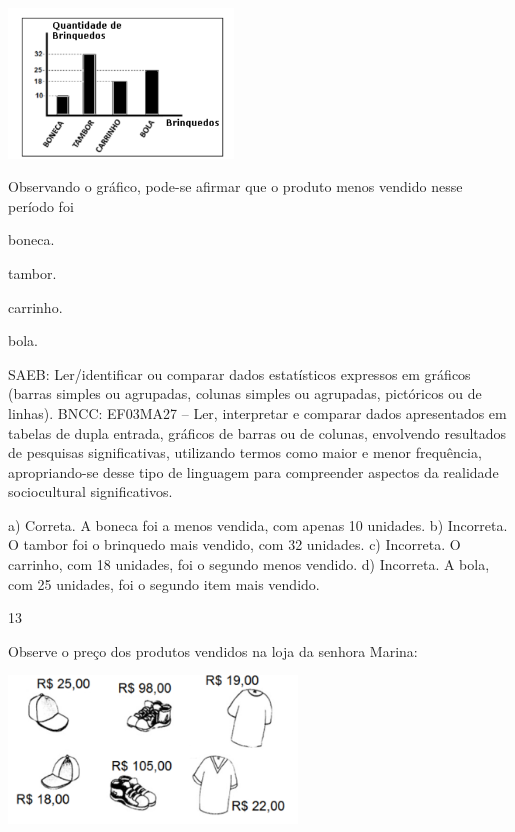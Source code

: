 \begin{multicols}{2}
\begin{enumerate}
{%

\includegraphics[width=2.35294in,height=1.56863in]{media/image137.png}

Observando o gráfico, pode-se afirmar que o produto menos vendido nesse período foi

\begin{escolha}

\item
  boneca.
\item
  tambor.
\item
  carrinho.
\item
  bola.
\end{escolha}

SAEB: Ler/identificar ou comparar dados estatísticos
expressos em gráficos (barras simples ou agrupadas, colunas simples ou agrupadas, pictóricos ou de linhas).
BNCC: EF03MA27 -- Ler, interpretar e comparar dados apresentados em tabelas de dupla entrada,
gráficos de barras ou de colunas, envolvendo resultados de pesquisas significativas, utilizando
termos como maior e menor frequência, apropriando-se desse tipo de linguagem para
compreender aspectos da realidade sociocultural significativos.

a) Correta. A boneca foi a menos vendida, com apenas 10 unidades.
b) Incorreta. O tambor foi o brinquedo mais vendido, com 32 unidades.
c) Incorreta. O carrinho, com 18 unidades, foi o segundo menos vendido.
d) Incorreta. A bola, com 25 unidades, foi o segundo item mais vendido.

\num{13}

Observe o preço dos produtos vendidos na loja da senhora Marina:


\includegraphics[width=3.02451in,height=1.54853in]{media/image138.png}

}
\end{enumerate}
\end{multicols}
